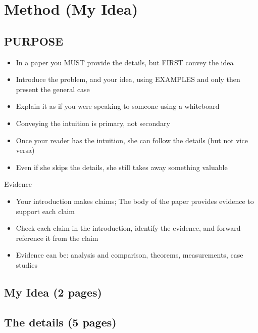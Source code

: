 \chapter{Method (My Idea)}

\section*{PURPOSE}
\begin{itemize}
\item In a paper you MUST provide the details,
but FIRST convey the idea
\item Introduce the problem, and your idea, using
EXAMPLES and only then present the general case
\item Explain it as if you were speaking to someone using
a whiteboard
\item Conveying the intuition is primary, not secondary
\item Once your reader has the intuition, she can follow
the details (but not vice versa)
\item Even if she skips the details, she still takes away
something valuable
\end{itemize}

Evidence
\begin{itemize}
\item Your introduction makes claims; The body of the paper provides evidence to support each claim
\item Check each claim in the introduction, identify the
evidence, and forward-reference it from the claim
\item Evidence can be: analysis and comparison, theorems,
measurements, case studies
\end{itemize}

\section{My Idea (2 pages)}

\section{The details (5 pages)}
